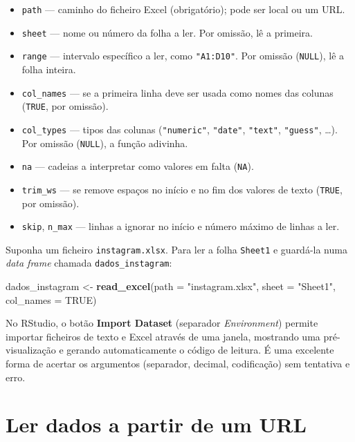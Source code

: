\documentclass[
  portuguese,
  11pt,
  openany]{book}
\newenvironment{Shaded}{\begin{snugshade}}{\end{snugshade}}
\newcommand{\AttributeTok}[1]{\textcolor[rgb]{0.13,0.29,0.53}{#1}}
\newcommand{\ConstantTok}[1]{\textcolor[rgb]{0.56,0.35,0.01}{#1}}
\newcommand{\FunctionTok}[1]{\textcolor[rgb]{0.13,0.29,0.53}{\textbf{#1}}}
\newcommand{\NormalTok}[1]{#1}
\newcommand{\OtherTok}[1]{\textcolor[rgb]{0.56,0.35,0.01}{#1}}
\newcommand{\StringTok}[1]{\textcolor[rgb]{0.31,0.60,0.02}{#1}}
\providecommand{\tightlist}{%
  \setlength{\itemsep}{0pt}\setlength{\parskip}{0pt}}
\begin{document}
\begin{itemize}
\tightlist
\item
  \texttt{path} --- caminho do ficheiro Excel (obrigatório); pode ser local ou um URL.
\item
  \texttt{sheet} --- nome ou número da folha a ler. Por omissão, lê a primeira.
\item
  \texttt{range} --- intervalo específico a ler, como \texttt{"A1:D10"}. Por omissão (\texttt{NULL}), lê a
  folha inteira.
\item
  \texttt{col\_names} --- se a primeira linha deve ser usada como nomes das colunas
  (\texttt{TRUE}, por omissão).
\item
  \texttt{col\_types} --- tipos das colunas (\texttt{"numeric"}, \texttt{"date"}, \texttt{"text"}, \texttt{"guess"}, \ldots).
  Por omissão (\texttt{NULL}), a função adivinha.
\item
  \texttt{na} --- cadeias a interpretar como valores em falta (\texttt{NA}).
\item
  \texttt{trim\_ws} --- se remove espaços no início e no fim dos valores de texto (\texttt{TRUE}, por
  omissão).
\item
  \texttt{skip}, \texttt{n\_max} --- linhas a ignorar no início e número máximo de linhas a ler.
\end{itemize}

Suponha um ficheiro \texttt{instagram.xlsx}. Para ler a folha \texttt{Sheet1} e guardá-la numa
\emph{data frame} chamada \texttt{dados\_instagram}:

\begin{Shaded}
\begin{Highlighting}[]
\NormalTok{dados\_instagram }\OtherTok{\textless{}{-}} \FunctionTok{read\_excel}\NormalTok{(}\AttributeTok{path =} \StringTok{"instagram.xlsx"}\NormalTok{,}
                              \AttributeTok{sheet =} \StringTok{"Sheet1"}\NormalTok{,}
                              \AttributeTok{col\_names =} \ConstantTok{TRUE}\NormalTok{)}
\end{Highlighting}
\end{Shaded}

No RStudio, o botão \textbf{Import Dataset} (separador \emph{Environment}) permite importar
ficheiros de texto e Excel através de uma janela, mostrando uma pré-visualização e
gerando automaticamente o código de leitura. É uma excelente forma de acertar os
argumentos (separador, decimal, codificação) sem tentativa e erro.

\section{Ler dados a partir de um URL}\label{ler-dados-a-partir-de-um-url}
\end{document}
